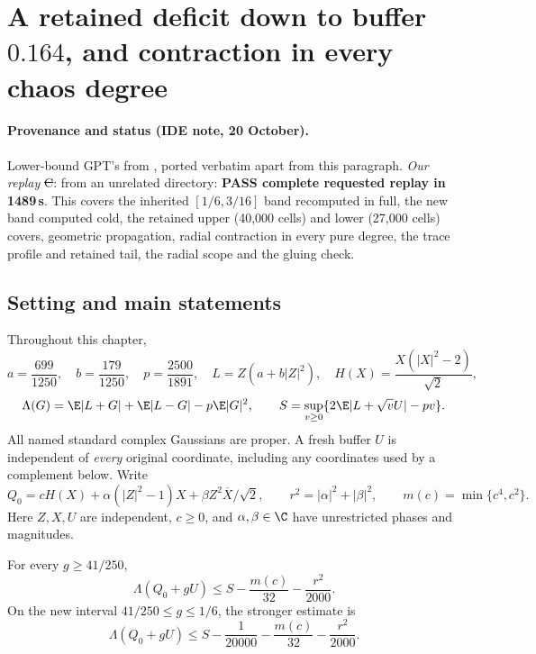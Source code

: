 \section{A retained deficit down to buffer \(0.164\), and contraction in every chaos degree}
\label{ch:buffer-bootstrap}

\paragraph{Provenance and status (IDE note, 20 October).} Lower-bound GPT's  from , ported verbatim
apart from this paragraph. \emph{Our replay} \st{C}:  from an unrelated directory: \textbf{PASS complete requested replay in
1489\,s}. This covers the inherited $[1/6,3/16]$ band recomputed in full, the new band computed cold, the retained upper (40{,}000 cells) and lower (27{,}000 cells) covers, geometric
propagation, radial contraction in every pure degree, the trace profile and retained tail, the radial scope and the gluing check.


\subsection{Setting and main statements}
Throughout this chapter,
\[
 a=\frac{699}{1250},\quad b=\frac{179}{1250},\quad
 p=\frac{2500}{1891},\quad L=Z(a+b|Z|^2),\quad
 H(X)=\frac{X(|X|^2-2)}{\sqrt2},
\]
\[
 \Lambda(G)=\E|L+G|+\E|L-G|-p\E|G|^2,\qquad
 S=\sup_{v\ge0}\{2\E|L+\sqrt vU|-pv\}.
\]
All named standard complex Gaussians are proper. A fresh buffer \(U\)
is independent of \emph{every} original coordinate, including any
coordinates used by a complement below. Write
\[
 Q_0=cH(X)+\alpha(|Z|^2-1)X+
                  \beta Z^2\overline X/\sqrt2,\qquad
 r^2=|\alpha|^2+|\beta|^2,\qquad m(c)=\min\{c^4,c^2\}.
\]
Here \(Z,X,U\) are independent, \(c\ge0\), and \(\alpha,\beta\in\C\)
have unrestricted phases and magnitudes.

\begin{theorem}
\label{thm:retained-buffer-bootstrap}
For every \(g\ge41/250\),
\[
 \boxed{\Lambda(Q_0+gU)\le
 S-\frac{m(c)}{32}-\frac{r^2}{2000}.}
\]
On the new interval \(41/250\le g\le1/6\), the stronger estimate is
\[
 \boxed{\Lambda(Q_0+gU)\le
 S-\frac1{20000}-\frac{m(c)}{32}-\frac{r^2}{2000}.}
\]
\end{theorem}

